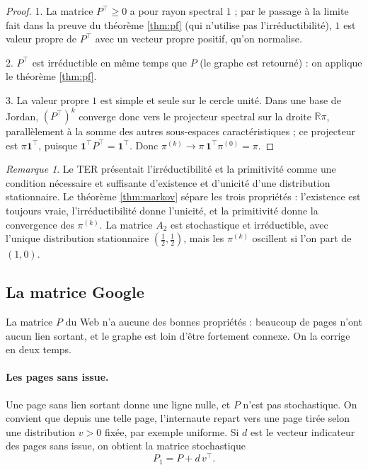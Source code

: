 \documentclass[11pt,a4paper]{article}
\theoremstyle{plain}
\theoremstyle{definition}
\theoremstyle{remark}
\newtheorem{remarque}[theoreme]{Remarque}
\newcommand{\R}{\mathbb{R}}
\newcommand{\un}{\mathbf{1}}
\begin{document}
\begin{proof}
1. La matrice $P^\top\geq0$ a pour rayon spectral $1$ ; par le passage à la limite fait dans la preuve du théorème \ref{thm:pf} (qui n'utilise pas l'irréductibilité), $1$ est valeur propre de $P^\top$ avec un vecteur propre positif, qu'on normalise.

2. $P^\top$ est irréductible en même temps que $P$ (le graphe est retourné) : on applique le théorème \ref{thm:pf}.

3. La valeur propre $1$ est simple et seule sur le cercle unité. Dans une base de Jordan, $(P^\top)^k$ converge donc vers le projecteur spectral sur la droite $\R\pi$, parallèlement à la somme des autres sous-espaces caractéristiques ; ce projecteur est $\pi\un^\top$, puisque $\un^\top P^\top=\un^\top$. Donc $\pi^{(k)}\to\pi\,\un^\top\pi^{(0)}=\pi$.
\end{proof}

\begin{remarque}
Le TER présentait l'irréductibilité et la primitivité comme une condition nécessaire et suffisante d'existence et d'unicité d'une distribution stationnaire. Le théorème \ref{thm:markov} sépare les trois propriétés : l'existence est toujours vraie, l'irréductibilité donne l'unicité, et la primitivité donne la convergence des $\pi^{(k)}$. La matrice $A_2$ est stochastique et irréductible, avec l'unique distribution stationnaire $(\frac12,\frac12)$, mais les $\pi^{(k)}$ oscillent si l'on part de $(1,0)$.
\end{remarque}

\subsection{La matrice Google}

La matrice $P$ du Web n'a aucune des bonnes propriétés : beaucoup de pages n'ont aucun lien sortant, et le graphe est loin d'être fortement connexe. On la corrige en deux temps.

\paragraph{Les pages sans issue.} Une page sans lien sortant donne une ligne nulle, et $P$ n'est pas stochastique. On convient que depuis une telle page, l'internaute repart vers une page tirée selon une distribution $v>0$ fixée, par exemple uniforme. Si $d$ est le vecteur indicateur des pages sans issue, on obtient la matrice stochastique
\[
  P_1=P+d\,v^\top .
\]
\end{document}
